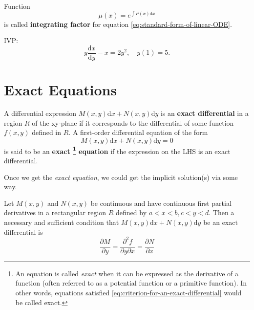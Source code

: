 \documentclass{beaulivre}
\begin{document}
Function
\[
    \mu (x) = e^{\int P(x) \mathrm{d}x}
\]
is called \textbf{integrating factor} for equation \ref{eq:standard-form-of-linear-ODE}.

\begin{example}
    IVP:
    \[
        y \dfrac{\mathrm{d}x}{\mathrm{d}y} -x = 2y^2, \quad y(1) = 5.
    \]
    \cite[page 63]{fcde}

\end{example}

\section{Exact Equations}

\begin{definition} \label{def:exact-equation}
    A differential expression $M(x, y) \mathrm{d}x + N(x, y) \mathrm{d}y$
    is an \textbf{exact differential} in a region $R$ of the 
    xy-plane if it corresponds to the differential of some function
    $f (x, y)$ defined in $R$. 
    A first-order differential equation of the form
    \[
        M(x, y) \mathrm{d}x + N(x, y) \mathrm{d}y = 0
    \]
    is said to be an 
    \textbf{
        exact
        \footnote{
            An equation is called \emph{exact}
            when it can be expressed as 
            the derivative of a function 
            (often referred to as a potential function 
            or a primitive function). 
            In other words, equations satisfied \ref{eq:criterion-for-an-exact-differential}
            would be called exact.
        } equation
    } if the expression on the 
    LHS is an exact differential.
    \cite[page 65]{fcde}
\end{definition}

Once we get the \emph{exact equation}, 
we could get the implicit solution(s)
via some way.

\begin{theorem}
    \label{criterion-for-an-exact-differential}
    Let $M(x, y)$ and $N(x, y)$ be continuous and 
    have continuous first partial derivatives 
    in a rectangular region $R$ defined by $a < x < b, c < y < d$. 
    Then a necessary and sufficient condition that 
    $M(x, y) \mathrm{d}x + N(x, y) \mathrm{d}y$ be an exact
    differential is
    \begin{equation}\label{eq:criterion-for-an-exact-differential}
        \dfrac{\partial M}{\partial y} = \dfrac{\partial^2 f}{\partial y \partial x} = \dfrac{\partial N}{\partial x}  
    \end{equation}
\end{theorem}
 
\end{document}
